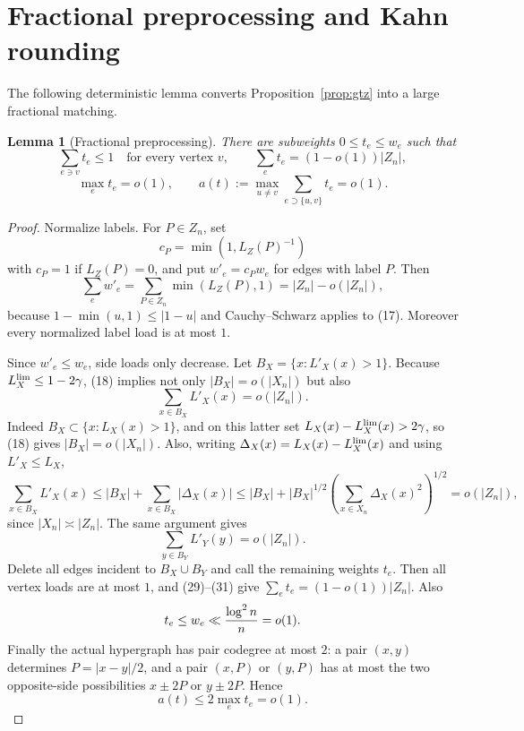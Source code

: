 \documentclass[11pt]{article}
\newtheorem{lemma}[theorem]{Lemma}
\begin{document}
\section{Fractional preprocessing and Kahn rounding}

The following deterministic lemma converts Proposition~\ref{prop:gtz} into a
large fractional matching.

\begin{lemma}[Fractional preprocessing]\label{lem:preprocess}
There are subweights $0\le t_e\le w_e$ such that
\[
  \sum_{e\ni v}t_e\le1\quad\text{for every vertex }v,
  \qquad
  \sum_e t_e=(1-o(1))|Z_n|,                              \tag{27}
\]
\[
  \max_e t_e=o(1),
  \qquad
  a(t):=\max_{u\ne v}\sum_{e\supset\{u,v\}}t_e=o(1).      \tag{28}
\]
\end{lemma}

\begin{proof}
Normalize labels.  For $P\in Z_n$, set
\[
  c_P=\min(1,L_Z(P)^{-1})
\]
with $c_P=1$ if $L_Z(P)=0$, and put $w'_e=c_Pw_e$ for edges with label $P$.
Then
\[
  \sum_e w'_e=\sum_{P\in Z_n}\min(L_Z(P),1)=|Z_n|-o(|Z_n|),              \tag{29}
\]
because $1-\min(u,1)\le |1-u|$ and Cauchy--Schwarz applies to (17).
Moreover every normalized label load is at most $1$.

Since $w'_e\le w_e$, side loads only decrease.  Let
$B_X=\{x:L'_X(x)>1\}$.  Because $L_X^{\rm lim}\le1-2\gamma$, (18) implies not
only $|B_X|=o(|X_n|)$ but also
\[
  \sum_{x\in B_X}L'_X(x)=o(|Z_n|).                       \tag{30}
\]
Indeed $B_X\subset\{x:L_X(x)>1\}$, and on this latter set
$L_X(x)-L_X^{\rm lim}(x)>2\gamma$, so (18) gives
$|B_X|=o(|X_n|)$.  Also, writing
$\Delta_X(x)=L_X(x)-L_X^{\rm lim}(x)$ and using $L'_X\le L_X$,
\[
  \sum_{x\in B_X}L'_X(x)
  \le |B_X|+\sum_{x\in B_X}|\Delta_X(x)|
  \le |B_X|+|B_X|^{1/2}
  \left(\sum_{x\in X_n}\Delta_X(x)^2\right)^{1/2}
  =o(|Z_n|),
\]
since $|X_n|\asymp |Z_n|$.  The same argument gives
\[
  \sum_{y\in B_Y}L'_Y(y)=o(|Z_n|).                       \tag{31}
\]
Delete all edges incident to $B_X\cup B_Y$ and call the remaining weights
$t_e$.  Then all vertex loads are at most $1$, and (29)--(31) give
$\sum_e t_e=(1-o(1))|Z_n|$.  Also
\[
  t_e\le w_e\ll {\log^2 n\over n}=o(1).
\]
Finally the actual hypergraph has pair codegree at most $2$: a pair $(x,y)$
determines $P=|x-y|/2$, and a pair $(x,P)$ or $(y,P)$ has at most the two
opposite-side possibilities $x\pm2P$ or $y\pm2P$.  Hence
\[
  a(t)\le2\max_e t_e=o(1).
\]
\end{proof}
\end{document}

